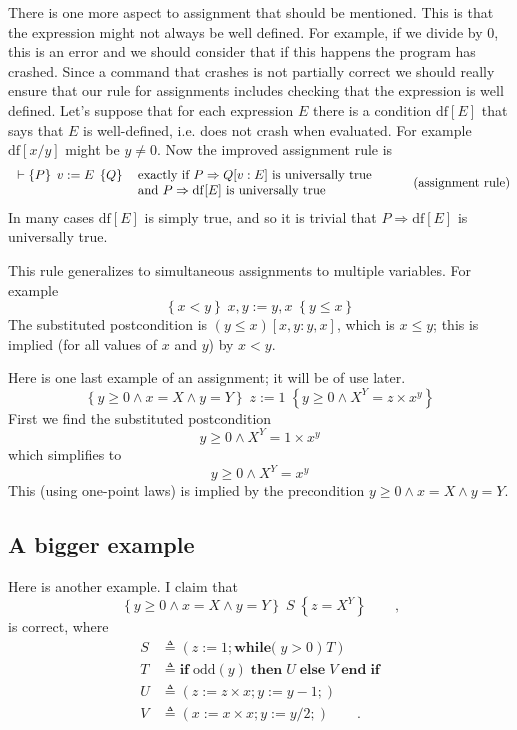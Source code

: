 \documentclass[11pt]{article}%
\begin{document}
There is one more aspect to assignment that should be mentioned. This is that
the expression might not always be well defined. For example, if we divide by
$0$, this is an error and we should consider that if this happens the program
has crashed. Since a command that crashes is not partially correct we should
really ensure that our rule for assignments includes checking that the
expression is well defined. Let's suppose that for each expression $E$ there
is a condition $\mathrm{df}[E]$ that says that $E$ is well-defined, i.e. does
not crash when evaluated. For example $\mathrm{df}[x/y]$ might be $y\neq0$.
Now the improved assignment rule is
\begin{equation}%
\begin{tabular}
[c]{ll}%
$\vdash\left\{  P\right\}  \;v:=E\;\left\{  Q\right\}  $ & $\text{exactly if
}P\Rightarrow Q[v:E]\text{ is universally true}$\\
& $\text{and }P\Rightarrow\mathrm{df}[E]\text{ is universally true}$%
\end{tabular}
\ \text{ }\tag{assignment rule}%
\end{equation}
In many cases $\mathrm{df}[E]$ is simply $\mathrm{true}$, and so it is trivial
that $P\Rightarrow\mathrm{df}[E]$ is universally true.

This rule generalizes to simultaneous assignments to multiple variables. For
example%
\[
\left\{  x<y\right\}  \;x,y:=y,x\;\left\{  y\leq x\right\}
\]
The substituted postcondition is $\left(  y\leq x\right)  [x,y:y,x]$, which is
$x\leq y$; this is implied (for all values of $x$ and $y$) by $x<y$.

Here is one last example of an assignment; it will be of use later.%
\[
\left\{  y\geq0\wedge x=X\wedge y=Y\right\}  \;z:=1\;\left\{  y\geq0\wedge
X^{Y}=z\times x^{y}\right\}
\]
First we find the substituted postcondition%
\[
y\geq0\wedge X^{Y}=1\times x^{y}%
\]
which simplifies to
\[
y\geq0\wedge X^{Y}=x^{y}%
\]
This (using one-point laws) is implied by the precondition $y\geq0\wedge
x=X\wedge y=Y$.

\subsection{A bigger example}

Here is another example. I claim that
\begin{equation}
\left\{  y\geq0\wedge x=X\wedge y=Y\right\}  \;S\;\left\{  z=X^{Y}\right\}
\qquad\text{,} \label{a}%
\end{equation}
is correct, where
\begin{align*}
S  &  \triangleq\left(  z:=1;\mathbf{while(}\;y>0\;)\;T\right) \\
T  &  \triangleq\mathbf{if}\;\mathit{\mathrm{odd}}(y)\;\mathbf{then}%
\;U\;\mathbf{else}\;V\;\mathbf{end\;if}\\
U  &  \triangleq(z:=z\times x;y:=y-1;)\\
V  &  \triangleq(x:=x\times x;y:=y/2;)\qquad\text{.}%
\end{align*}
\end{document}
